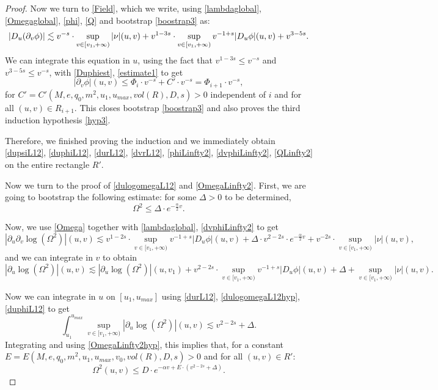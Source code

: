 \documentclass[10pt,a4paper]{article}
\theoremstyle{plain}
\theoremstyle{remark}
\theoremstyle{definition}
\theoremstyle{plain}
\theoremstyle{remark}
\theoremstyle{definition}
\newcommand{\uu}{u_{max}}
\numberwithin{equation}{section}
\begin{document}
\begin{proof}
	Now we turn to \eqref{Field}\color{black}, which we write, using \eqref{lambdaglobal}, \eqref{Omegaglobal}, \eqref{phi}, \eqref{Q} and bootstrap \eqref{boostrap3} as: $$ |D_u(\partial_v \phi)| \lesssim v^{-s} \cdot \sup_{ v\in [v_1,+\infty)} |\nu|(u,v)+ v^{1-3s} \cdot \sup_{ v\in [v_1,+\infty)}  v^{-1+s} \color{black} |D_u \phi|(u,v) + v^{3-5s}.$$ We can integrate this equation in $u$, using the fact that $v^{1-3s} \leq v^{-s}$ and $v^{3-5s} \leq v^{-s}$, with \eqref{Duphiest}, \eqref{estimate1} to get \begin{equation}
	|\partial_v \phi|(u,v)\leq \Phi_i \cdot v^{-s} + C' \cdot v^{-s}=\Phi_{i+1} \cdot v^{-s},
	\end{equation} for $C'=C'(M,e,q_0,m^2,u_1,\uu,vol(R),D,s)>0$ independent of $i$ and for all $(u,v) \in R_{i+1}$. This closes bootstrap \eqref{boostrap3} and also proves the third induction hypothesis \eqref{hyp3}.
	
	
	Therefore, we finished proving the induction and we immediately obtain  \eqref{dupsiL12}, \eqref{duphiL12}, \eqref{durL12}, \eqref{dvrL12}, \eqref{phiLinfty2}, \eqref{dvphiLinfty2}, \eqref{QLinfty2} on the entire rectangle $R'$.
	
	Now we turn to the proof of \eqref{dulogomegaL12} and \eqref{OmegaLinfty2}. First, we are going to bootstrap the following estimate: for some $\Delta>0$ to be determined, \begin{equation} \label{bootstrap4}
	\Omega^2 \leq \Delta \cdot  e^{-\frac{\alpha}{2} v}.
	\end{equation}
	
	Now, we use \eqref{Omega} together with \eqref{lambdaglobal}, \eqref{dvphiLinfty2} to get $$ |\partial_u \partial_v \log(\Omega^2)|(u,v) \lesssim v^{1-2s} \cdot \sup_{ v \in [v_1,+\infty)} v^{-1+s} |D_u \phi|(u,v) + \Delta \cdot v^{2-2s}  \cdot  e^{-\frac{\alpha}{2} v}+v^{-2s} \cdot \sup_{ v \in [v_1,+\infty)}|\nu|(u,v),$$ and we can integrate in $v$ to obtain  $$ |\partial_u \log(\Omega^2)|(u,v) \lesssim |\partial_u \log(\Omega^2)|(u,v_1)+ v^{2-2s} \cdot \sup_{ v \in [v_1,+\infty)} v^{-1+s} |D_u \phi|(u,v) + \Delta +  \sup_{ v \in [v_1,+\infty)}|\nu|(u,v).$$
	
	Now we can integrate in $u$ on $[u_1,\uu]$ using \eqref{durL12}, \eqref{dulogomegaL12hyp}, \eqref{duphiL12} to get \begin{equation} \int_{u_1}^{\uu} \sup_{ v \in [v_1,+\infty)}
	|\partial_u  \log(\Omega^2)|(u,v) \lesssim v^{2-2s} + \Delta.
	\end{equation}
	Integrating and using \eqref{OmegaLinfty2hyp}, this implies that, for a constant $E=E(M,e,q_0,m^2,u_1,\uu,v_0,vol(R),D,s)>0$ and for all $(u,v) \in R'$: $$ \Omega^2(u,v) \leq D \cdot e^{-\alpha v + E \cdot ( v^{2-2s} + \Delta)}.$$
	

\end{proof}
\end{document}
